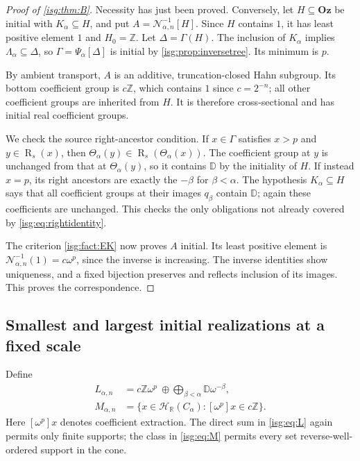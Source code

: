 \documentclass[11pt]{article}
\theoremstyle{definition}
\theoremstyle{remark}
\newcommand{\Oz}{\ensuremath{\mathbf{Oz}}}
\newcommand{\R}{\mathbb{R}}
\newcommand{\Z}{\mathbb{Z}}
\newcommand{\D}{\mathbb{D}}
\newcommand{\Rs}{\operatorname{R}_{s}}
\newcommand{\Hahn}[2]{\mathcal{H}_{#1}(#2)}
\newcommand{\Rect}{\mathcal{N}_{\alpha,n}}
\newcommand{\tht}{\Theta_{\alpha}}
\newcommand{\psiA}{\Psi_{\alpha}}
\begin{document}
\begin{proof}[Proof of \cref{isg:thm:B}]
Necessity has just been proved. Conversely, let $H\subseteq\Oz$ be
initial with $K_\alpha\subseteq H$, and put $A=\Rect^{-1}[H]$.
Since $H$ contains $1$, it has least positive element $1$ and $H_0=\Z$.
Let $\Delta=\Gamma(H)$. The inclusion of $K_\alpha$ implies
$\Lambda_\alpha\subseteq\Delta$, so
$\Gamma=\psiA[\Delta]$ is initial by \cref{isg:prop:inversetree}.
Its minimum is $p$.

By ambient transport, $A$ is an additive, truncation-closed Hahn subgroup.
Its bottom coefficient group is $c\Z$, which contains $1$ since
$c=2^{-n}$; all other coefficient groups are inherited from $H$.
It is therefore cross-sectional and has initial real coefficient groups.

We check the source right-ancestor condition. If $x\in\Gamma$ satisfies
$x>p$ and $y\in\Rs(x)$, then
$\tht(y)\in\Rs(\tht(x))$. The coefficient group at $y$ is unchanged
from that at $\tht(y)$, so it contains $\D$ by the initiality of $H$.
If instead $x=p$, its right ancestors are exactly the $-\beta$ for
$\beta<\alpha$. The hypothesis $K_\alpha\subseteq H$ says that all
coefficient groups at their images $q_\beta$ contain $\D$; again these
coefficients are unchanged. This checks the only obligations not already
covered by \eqref{isg:eq:rightidentity}.

The criterion \cref{isg:fact:EK} now proves $A$ initial. Its least positive
element is $\Rect^{-1}(1)=c\omega^p$, since the inverse is increasing.
The inverse identities show uniqueness, and a fixed bijection preserves
and reflects inclusion of its images. This proves the correspondence.
\end{proof}

\subsection{Smallest and largest initial realizations at a fixed scale}
Define
\begin{align}
 L_{\alpha,n}
   &=c\Z\omega^p\ \oplus\!
     \bigoplus_{\beta<\alpha}\D\omega^{-\beta},\label{isg:eq:L}\\
 M_{\alpha,n}
   &=\{x\in\Hahn{\R}{C_\alpha}:[\omega^p]x\in c\Z\}.
   \label{isg:eq:M}
\end{align}
Here $[\omega^p]x$ denotes coefficient extraction. The direct sum in
\eqref{isg:eq:L} again permits only finite supports; the class in
\eqref{isg:eq:M} permits every set reverse-well-ordered support in the cone.
\end{document}
